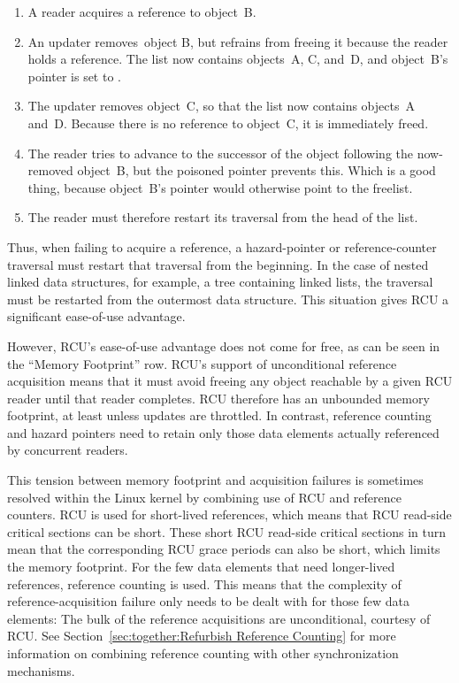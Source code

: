 \begin{enumerate}
\item	A reader acquires a reference to object~B.
\item	An updater removes~object B, but refrains from freeing it because
	the reader holds a reference.
	The list now contains objects~A, C, and~D, and
	object~B's  pointer is set to .
\item	The updater removes object~C, so that the list now contains
	objects~A and~D.
	Because there is no reference to object~C, it is immediately freed.
\item	The reader tries to advance to the successor of the object
	following the now-removed object~B, but the poisoned
	 pointer prevents this.
	Which is a good thing, because object~B's  pointer
	would otherwise point to the freelist.
\item	The reader must therefore restart its traversal from the head
	of the list.
\end{enumerate}

Thus, when failing to acquire a reference, a hazard-pointer or
reference-counter traversal must restart that traversal from the
beginning.
In the case of nested linked data structures, for example, a
tree containing linked lists, the traversal must be restarted from
the outermost data structure.
This situation gives RCU a significant ease-of-use advantage.

However, RCU's ease-of-use advantage does not come
for free, as can be seen in the ``Memory Footprint'' row.
RCU's support of unconditional reference acquisition means that
it must avoid freeing any object reachable by a given
RCU reader until that reader completes.
RCU therefore has an unbounded memory footprint, at least unless updates
are throttled.
In contrast, reference counting and hazard pointers need to  retain only
those data elements actually referenced by concurrent readers.

This tension between memory footprint and acquisition
failures is sometimes resolved within the Linux kernel by combining use
of RCU and reference counters.
RCU is used for short-lived references, which means that RCU read-side
critical sections can be short.
These short RCU read-side critical sections in turn mean that the corresponding
RCU grace periods can also be short, which limits the memory footprint.
For the few data elements that need longer-lived references, reference
counting is used.
This means that the complexity of reference-acquisition failure only
needs to be dealt with for those few data elements:  The bulk of
the reference acquisitions are unconditional, courtesy of RCU.
See Section~\ref{sec:together:Refurbish Reference Counting}
for more information on combining reference counting with other
synchronization mechanisms.


